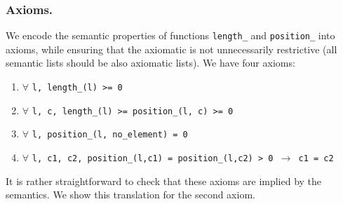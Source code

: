 \documentclass[runningheads,a4paper]{llncs}
\begin{document}
\subsubsection{Axioms.}

We encode the semantic properties of functions \verb|length_|
and \verb|position_| into axioms, while ensuring that the axiomatic is not
unnecessarily restrictive (all semantic lists should be also axiomatic lists).
We have four axioms:

{\small
\begin{enumerate}
\item $\forall$ \verb|l, length_(l) >= 0|
\item $\forall$ \verb|l, c, length_(l) >= position_(l, c) >= 0|
\item $\forall$ \verb|l, position_(l, no_element) = 0|
\item $\forall$ \verb|l, c1, c2, position_(l,c1) = position_(l,c2) > 0 |$\rightarrow$\verb| c1 = c2|
\end{enumerate}
}

It is rather straightforward to check that these axioms are implied by the
semantics.
\ifdefined\longversion
We show this translation for the second axiom.
\end{document}
